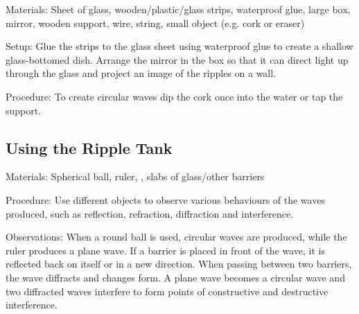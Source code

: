 \begin{multicols}{2}
\begin{description*}
\item[Materials:]{Sheet of glass, wooden/plastic/glass strips, waterproof glue, large box, mirror, wooden support, wire, string, small object (e.g. cork or eraser)}
\item[Setup:]{Glue the strips to the glass sheet using waterproof glue to create a shallow glass-bottomed dish. Arrange the mirror in the box so that it can direct light up through the glass and project an image of the ripples on a wall.}
\item[Procedure:]{To create circular waves dip the cork once into the water or tap the support.}
\end{description*}

\columnbreak

\subsection{Using the Ripple Tank}
\label{sub:rippletank}


\begin{description*}
\item[Materials:]{Spherical ball, ruler, , slabs of glass/other barriers}
\item[Procedure:]{Use different objects to observe various behaviours of the waves produced, such as reflection, refraction, diffraction and interference.}
\item[Observations:]{When a round ball is used, circular waves are produced, while the ruler produces a plane wave. If a barrier is placed in front of the wave, it is reflected back on itself or in a new direction. When passing between two barriers, the wave diffracts and changes form. A plane wave becomes a circular wave and two diffracted waves interfere to form points of constructive and destructive interference.}
\end{description*}


\end{multicols}
